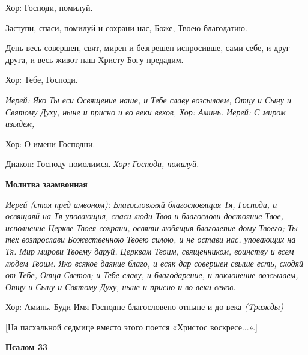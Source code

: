   Хор:\normalfont{} Господи, помилуй. 


  Заступи, спаси, помилуй и сохрани нас, Боже, Твоею благодатию. 


  День весь совершен, свят, мирен и безгрешен испросивше, сами себе, и друг друга, и весь живот наш Христу Богу предадим. \itshape 


  Хор:\normalfont{} Тебе, Господи. 


\itshape Иерей:\normalfont{} Яко Ты еси Освящение наше, и Тебе славу возсылаем, Отцу и Сыну и Святому Духу, ныне и присно и во веки веков, \itshape  Хор:\normalfont{} Аминь. \itshape  Иерей: С\normalfont{} миром изыдем, \itshape 


  Хор:\normalfont{} О имени Господни. \itshape 


  Диакон:\normalfont{} Господу помолимся. \itshape  Хор:\normalfont{} Господи, помилуй. 


\medskip


 \bfseries Молитва заамвонная \normalfont{}


\itshape   Иерей (стоя пред амвоном):\normalfont{} Благословляяй благословящия Тя, Господи, и освящаяй на Тя уповающия, спаси люди Твоя и благослови достояние Твое, исполнение Церкве Твоея сохрани, освяти любящия благолепие дому Твоего; Ты тех возпрослави Божественною Твоею силою, и не остави нас, уповающих на Тя. Мир мирови Твоему даруй, Церквам Твоим, священником, воинству и всем людем Твоим. Яко всякое даяние благо, и всяк дар совершен свыше есть, сходяй от Тебе, Отца Светов; и Тебе славу, и благодарение, и поклонение возсылаем, Отцу и Сыну и Святому Духу, ныне и присно и во веки веков. \itshape 


  Хор:\normalfont{} Аминь. Буди Имя Господне благословено отныне и до века \itshape (Tрижд\normalfont{}ы)


  [На пасхальной седмице вместо этого поется «Христос воскресе...».]


\medskip


\bfseries  Псалом 33 \normalfont{}\nopagebreak


